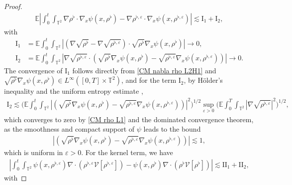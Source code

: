 \begin{proof}
\begin{align}
\mathbb{E}\left|\int_{0}^{t} \int_{\mathbb{T}^2} \nabla \rho^{\flat} \cdot\nabla_x \psi(x, \rho^{\flat})-\nabla \rho^{\flat,\varepsilon} \cdot\nabla_x\psi (x, \rho^{\flat,\varepsilon})\right|
\lesssim \mathrm{I}_1+\mathrm{I}_2,
\end{align}
with
\begin{align*}
\mathrm{I}_1 & = \mathbb{E}\int_{0}^{t} \int_{\mathbb{T}^2}\left|\left(\nabla \sqrt{\rho^{\flat}}-\nabla \sqrt{\rho^{\flat,\varepsilon}}\right) \cdot \sqrt{\rho^{\flat}}\nabla_x\psi  (x, \rho^{\flat})\right| \to 0, \\
\mathrm{I}_2 & = \mathbb{E}\int_{0}^{t} \int_{\mathbb{T}^2}\left|\nabla \sqrt{\rho^{\flat,\varepsilon}} \cdot\left(\sqrt{\rho^{\flat}}\nabla_x\psi  (x, \rho^{\flat})-\sqrt{\rho^{\flat,\varepsilon}} \nabla_x\psi  (x, \rho^{\flat,\varepsilon})\right)\right| \to 0.
\end{align*}
The convergence of $\mathrm{I}_1$ follows directly from \eqref{CM nabla rho L2H1} and 
$\sqrt{\rho^{\flat}}\nabla_x\psi  (x, \rho^{\flat}) \in L^{\infty}([0,T] \times \mathbb{T}^2)$, and for the term $\mathrm{I}_2$, by H\"older's inequality and the uniform entropy estimate , 
\begin{align*}
\mathrm{I}_2 \lesssim \Big(\mathbb{E}\int_{0}^{t} \int_{\mathbb{T}^2}\left|\left(\sqrt{\rho^{\flat}}\nabla_x\psi  (x, \rho^{\flat})-\sqrt{\rho^{\flat, \varepsilon}} \nabla_x\psi  (x, \rho^{\flat,\varepsilon})\right)\right|^2\Big)^{1/2} \sup_{\varepsilon > 0} \Big(\mathbb{E}\int_{0}^{T} \int_{\mathbb{T}^2}\left|\nabla \sqrt{\rho^{\flat,\varepsilon}} \right|^2\Big)^{1/2},
\end{align*}
which converges to zero by \eqref{CM rho L1} and the dominated convergence theorem,
as the smoothness and compact support of $\psi$ leads to the bound
\begin{align*}
\left|\left(\sqrt{\rho^{\flat}}\nabla_x\psi  (x, \rho^{\flat})-\sqrt{\rho^{\flat, \varepsilon}} \nabla_x\psi  (x, \rho^{\flat,\varepsilon})\right)\right| \lesssim 1,
\end{align*}
which is uniform in $\varepsilon > 0$. For the kernel term, we have
\begin{align}\label{b ker}
\left|\int_{0}^{t} \int_{\mathbb{T}^2} \psi (x, \rho^{\flat,\varepsilon}) \nabla \cdot\left(\rho^{\flat,\varepsilon} \mathcal{V}[\rho^{\flat,\varepsilon}]\right) - \psi (x, \rho^{\flat}) \nabla \cdot\left(\rho^{\flat} \mathcal{V}[\rho^{\flat}]\right)\right| \lesssim \mathrm{II}_{1} + \mathrm{II}_{2},
\end{align}
with

\end{proof}
